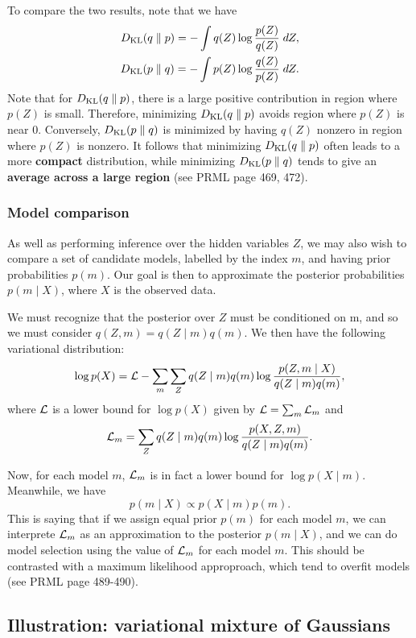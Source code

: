 \documentclass[a4paper]{article}
\begin{document}
To compare the two results, note that we have 
\[
\begin{aligned}
D_{\text{KL}}(q \; \Vert \; p) = - \int q(Z) \log \frac{p(Z)}{q(Z)} \; d Z, \\
D_{\text{KL}}(p \; \Vert \; q) = - \int p(Z) \log \frac{q(Z)}{p(Z)} \; d Z.
\end{aligned}
\]
Note that for $D_{\text{KL}}(q \; \Vert \; p)$, there is a large positive 
contribution in region where $p(Z)$ is small.
Therefore, minimizing $D_{\text{KL}}(q \; \Vert \; p)$ avoids region 
where $p(Z)$ is near $0$. Conversely, 
$D_{\text{KL}}(p \; \Vert \; q)$ is minimized by having $q(Z)$ nonzero 
in region where $p(Z)$ is nonzero. It follows that 
minimizing $D_{\text{KL}}(q \; \Vert \; p)$ often leads to a more \textbf{compact} 
distribution, while minimizing $D_{\text{KL}}(p \; \Vert \; q)$ tends 
to give an \textbf{average across a large region}
(see PRML page 469, 472).

\subsubsection{Model comparison}

As well as performing inference over the hidden variables 
$Z$, we may also wish to compare a set of candidate models, 
labelled by the index $m$, and having prior probabilities 
$p(m)$. Our goal is then to approximate the posterior 
probabilities $p(m \mid X)$, where $X$ is the observed data.

We must recognize that the posterior over $Z$ must be 
conditioned on m, and so we must consider
$q(Z, m) = q(Z \mid m) q(m)$. We then have the following 
variational distribution:
\[
\log p(X) = \mathcal{L} - \sum_m \sum_Z q(Z \mid m) q(m) 
\log \frac{p(Z, m \mid X)}{q(Z \mid m) q(m)},
\]
where $\mathcal{L}$ is a lower bound for $\log p(X)$ given 
by $\mathcal{L} = \sum_m \mathcal{L}_m$ and
\[
\mathcal{L}_m = \sum_Z q(Z \mid m) q(m) 
\log \frac{p(X, Z, m)}{q(Z \mid m) q(m)}.
\]

Now, for each model $m$, $\mathcal{L}_m$ is in fact 
a lower bound for $\log p(X \mid m)$. Meanwhile, we have
\[
p(m \mid X) \propto p(X \mid m) p(m).
\]
This is saying that if we assign equal prior $p(m)$ for each model $m$,
we can interprete $\mathcal{L}_m$ as an approximation to the posterior
$p(m \mid X)$, and we can do model selection using the value 
of $\mathcal{L}_m$ for each model $m$. This should be contrasted with a
maximum likelihood approproach, which tend to overfit 
models (see PRML page 489-490).


\subsection{Illustration: variational mixture of
Gaussians}
\end{document}
